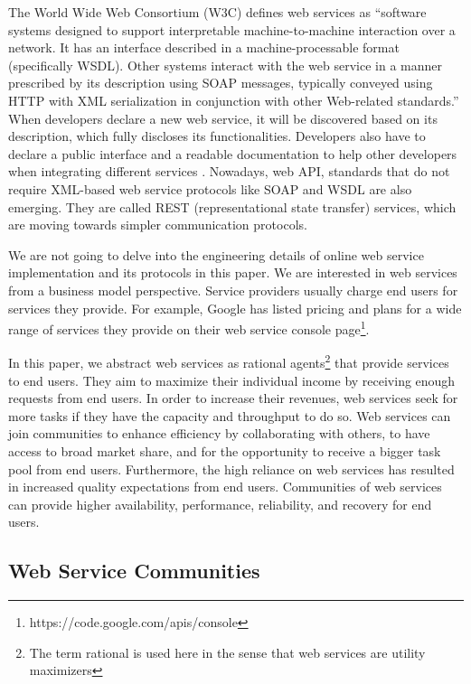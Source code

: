 The World Wide Web Consortium (W3C) defines web services as ``software systems designed to support interpretable machine-to-machine interaction over a network. It has an interface described in a machine-processable format (specifically WSDL). Other systems interact with the web service in a manner prescribed by its description using SOAP messages, typically conveyed using HTTP with XML serialization in conjunction with other Web-related standards.'' When developers declare a new web service, it will be
discovered based on its description, which fully discloses its functionalities. Developers also have to declare a public interface and a readable documentation to help other developers when integrating different services \cite{w3cwsdl}. Nowadays, web API, standards that do not require XML-based web service protocols like SOAP and WSDL are also emerging. They are called REST (representational state transfer) services, which are moving towards simpler communication protocols.

We are not going to delve into the engineering details of online web service implementation and its protocols in this paper. We are interested in web services from a business model perspective. Service providers usually charge end users for services they provide. For example, Google has listed pricing and plans for a wide range of services they provide on their web service console page\footnote{https://code.google.com/apis/console}.

In this paper, we abstract web services as rational agents\footnote{The term rational is used here in the sense that web services are utility maximizers} that provide services to end users. They aim to maximize their individual income  by receiving enough requests from end users. In order to increase their revenues, web services seek for more tasks if they have the capacity and throughput to do so. Web services can join communities to enhance efficiency by collaborating with others, to have access to broad market share, and for the opportunity to receive a bigger task pool from end users. Furthermore, the high reliance on web services has resulted in increased quality expectations from end users. Communities of web services can provide higher availability, performance, reliability, and recovery for end users.

\subsection{Web Service Communities}\label{s:wsc}

